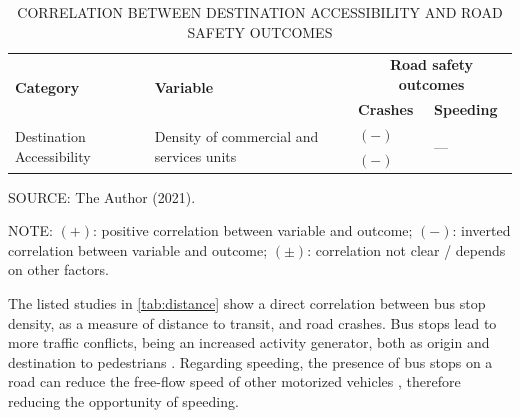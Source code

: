 \begin{table}[!hbtp]
    \footnotesize
    \captionsetup{justification=raggedright,
        singlelinecheck=false,
        font=footnotesize}
    \caption{CORRELATION BETWEEN DESTINATION ACCESSIBILITY AND ROAD SAFETY OUTCOMES}
    \centering
    \begin{tabular}{p{4cm}p{4cm}p{4cm}p{2cm}}
        \hline
        \multirow{2}{4cm}{\textbf{Category}} & \multirow{2}{4cm}{\textbf{Variable}} & \multicolumn{2}{c}{\textbf{Road safety outcomes}} \\
         &  & \textbf{Crashes} & \textbf{Speeding} \\ \hline
        \multirow{3}{4cm}{Destination Accessibility} & \multirow{3}{4cm}{Density of commercial and services units} & $(-)$ \textcite{Ouyang2014} & \multirow{2}{2cm}{---} \\
         &  & $(-)$ \textcite{Welle2016} &  \\ \hline
    \end{tabular}
    \label{tab:destination}
    \par \vspace{2mm} \footnotesize \raggedright
    SOURCE: The Author (2021).
    \par \vspace{1mm} \footnotesize \raggedright
    NOTE: $(+)$: positive correlation between variable and outcome; $(-)$: inverted correlation between variable and outcome; $(\pm)$: correlation not clear / depends on other factors.
\end{table}

The listed studies in \autoref{tab:distance} show a direct correlation between bus stop density, as a measure of distance to transit, and road crashes. Bus stops lead to more traffic conflicts, being an increased activity generator, both as origin and destination to pedestrians \cite{Kim2010}. Regarding speeding, the presence of bus stops on a road can reduce the free-flow speed of other motorized vehicles \cite{Bansal2014, Koshy2005}, therefore reducing the opportunity of speeding. 

